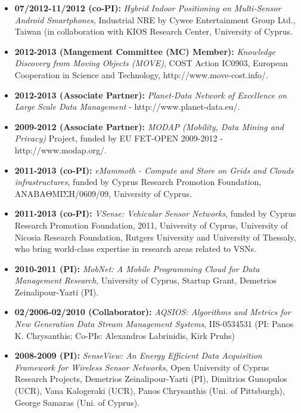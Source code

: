 \documentclass[10pt]{article}
\begin{document}
\begin{itemize}
\item {\bf 07/2012-11/2012 (co-PI):} {\em Hybrid Indoor Positioning on Multi-Sensor Android Smartphones}, Industrial NRE by Cywee Entertainment Group Ltd., Taiwan (in collaboration with KIOS Research Center, University of Cyprus.

\item {\bf 2012-2013 (Mangement Committee (MC) Member):}  {\em Knowledge Discovery from Moving Objects (MOVE)},  COST Action IC0903, European Cooperation in Science and Technology,  http://www.move-cost.info/.

\item {\bf 2012-2013 (Associate Partner):}  {\em Planet-Data Network of Excellence on Large Scale Data Management} - http://www.planet-data.eu/.

\item {\bf 2009-2012 (Associate Partner):}  {\em MODAP (Mobility, Data Mining and Privacy)} Project, funded by EU FET-OPEN 2009-2012 - http://www.modap.org/.

\item  {\bf 2011-2013 (co-PI):} {\em eMammoth - Compute and Store on Grids and Clouds infrastructures}, funded by Cyprus Research Promotion Foundation, ΑΝΑΒΑΘΜΙΣΗ/0609/09, University of Cyprus.

\item  {\bf 2011-2013 (co-PI):} {\em VSense: Vehicular Sensor Networks}, funded by Cyprus Research Promotion Foundation, 2011, University of Cyprus, University of Nicosia Research Foundation, Rutgers University and University of Thessaly, who bring world-class expertise in research areas related to VSNs.

\item  {\bf 2010-2011 (PI):} {\em MobNet: A Mobile Programming Cloud for Data Management Research}, University of Cyprus, Startup Grant, Demetrios Zeinalipour-Yazti (PI).

\item {\bf 02/2006-02/2010 (Collaborator):} {\em AQSIOS: Algorithms and Metrics for New Generation Data Stream Management Systems},
IIS-0534531 (PI: Panos K. Chrysanthis; Co-PIs: Alexandros Labrinidis, Kirk Pruhs)

\item  {\bf 2008-2009 (PI):} {\em SenseView: An Energy Efficient Data Acquisition Framework for Wireless Sensor Networks}, Open University of Cyprus Research Projects, Demetrios Zeinalipour-Yazti (PI), Dimitrios Gunopulos (UCR), Vana Kalogeraki (UCR), Panos Chrysanthis (Uni. of Pittsburgh), George Samaras (Uni. of Cyprus).


\end{itemize}
\end{document}
